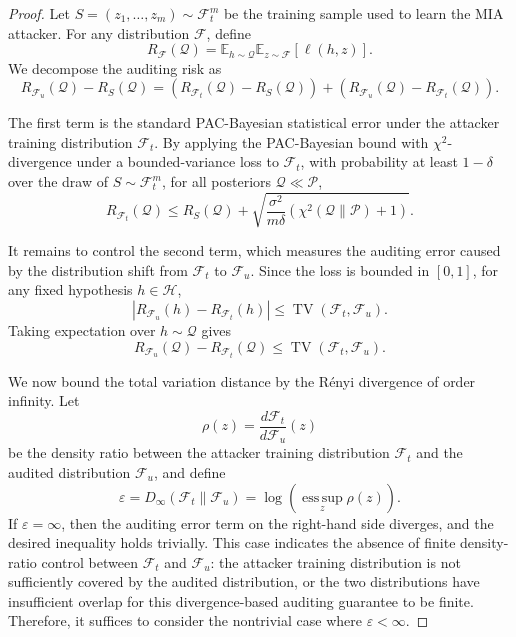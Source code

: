 \documentclass{article}
\theoremstyle{plain}
\theoremstyle{definition}
\theoremstyle{remark}
\begin{document}
\begin{proof}
Let $S=(z_1,\ldots,z_m)\sim \mathcal F_t^m$ be the training sample used to learn the MIA attacker. For any distribution $\mathcal F$, define
\begin{equation}
R_{\mathcal F}(\mathcal Q)
=
\mathbb E_{h\sim\mathcal Q}
\mathbb E_{z\sim\mathcal F}[\ell(h,z)].
\end{equation}
We decompose the auditing risk as
\begin{equation}
R_{\mathcal F_u}(\mathcal Q)-R_S(\mathcal Q)
=
\left(
R_{\mathcal F_t}(\mathcal Q)-R_S(\mathcal Q)
\right)
+
\left(
R_{\mathcal F_u}(\mathcal Q)-R_{\mathcal F_t}(\mathcal Q)
\right).
\end{equation}

The first term is the standard PAC-Bayesian statistical error under the attacker training distribution $\mathcal F_t$. By applying the PAC-Bayesian bound with $\chi^2$-divergence under a bounded-variance loss to $\mathcal F_t$, with probability at least $1-\delta$ over the draw of $S\sim\mathcal F_t^m$, for all posteriors $\mathcal Q\ll\mathcal P$,
\begin{equation}
R_{\mathcal F_t}(\mathcal Q)
\le
R_S(\mathcal Q)
+
\sqrt{
\frac{\sigma^2}{m\delta}
\left(
\chi^2(\mathcal Q\|\mathcal P)+1
\right)
}.
\end{equation}

It remains to control the second term, which measures the auditing error caused by the distribution shift from $\mathcal F_t$ to $\mathcal F_u$. Since the loss is bounded in $[0,1]$, for any fixed hypothesis $h\in\mathcal H$,
\begin{equation}
\left|
R_{\mathcal F_u}(h)-R_{\mathcal F_t}(h)
\right|
\le
\operatorname{TV}(\mathcal F_t,\mathcal F_u).
\end{equation}
Taking expectation over $h\sim\mathcal Q$ gives
\begin{equation}
R_{\mathcal F_u}(\mathcal Q)-R_{\mathcal F_t}(\mathcal Q)
\le
\operatorname{TV}(\mathcal F_t,\mathcal F_u).
\end{equation}

We now bound the total variation distance by the Rényi divergence of order infinity. Let
\begin{equation}
\rho(z)
=
\frac{d\mathcal F_t}{d\mathcal F_u}(z)
\end{equation}
be the density ratio between the attacker training distribution $\mathcal F_t$ and the audited distribution $\mathcal F_u$, and define
\begin{equation}
\varepsilon
=
D_\infty(\mathcal F_t\|\mathcal F_u)
=
\log\left(
\operatorname*{ess\,sup}_{z}\rho(z)
\right).
\end{equation}
If $\varepsilon=\infty$, then the auditing error term on the right-hand side diverges, and the desired inequality holds trivially. This case indicates the absence of finite density-ratio control between $\mathcal F_t$ and $\mathcal F_u$: the attacker training distribution is not sufficiently covered by the audited distribution, or the two distributions have insufficient overlap for this divergence-based auditing guarantee to be finite. Therefore, it suffices to consider the nontrivial case where $\varepsilon<\infty$.


\end{proof}
\end{document}
